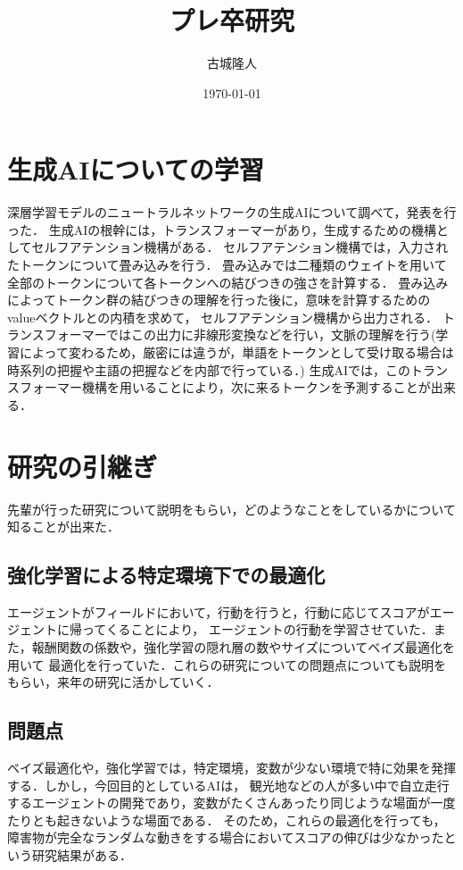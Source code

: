 \documentclass[a4paper,11pt]{ltjsarticle}
\begin{document}
\title{プレ卒研究}
\author{古城隆人}
\date{\today}
\maketitle

\newpage

\section{生成AIについての学習}
深層学習モデルのニュートラルネットワークの生成AIについて調べて，発表を行った．
生成AIの根幹には，トランスフォーマーがあり，生成するための機構としてセルフアテンション機構がある．
セルフアテンション機構では，入力されたトークンについて畳み込みを行う．
畳み込みでは二種類のウェイトを用いて全部のトークンについて各トークンへの結びつきの強さを計算する．
畳み込みによってトークン群の結びつきの理解を行った後に，意味を計算するためのvalueベクトルとの内積を求めて，
セルフアテンション機構から出力される．
トランスフォーマーではこの出力に非線形変換などを行い，文脈の理解を行う(学習によって変わるため，厳密には違うが，単語をトークンとして受け取る場合は時系列の把握や主語の把握などを内部で行っている．)
生成AIでは，このトランスフォーマー機構を用いることにより，次に来るトークンを予測することが出来る．
\section{研究の引継ぎ}
先輩が行った研究について説明をもらい，どのようなことをしているかについて知ることが出来た．
\subsection{強化学習による特定環境下での最適化}
エージェントがフィールドにおいて，行動を行うと，行動に応じてスコアがエージェントに帰ってくることにより，
エージェントの行動を学習させていた．また，報酬関数の係数や，強化学習の隠れ層の数やサイズについてベイズ最適化を用いて
最適化を行っていた．これらの研究についての問題点についても説明をもらい，来年の研究に活かしていく．
\subsection{問題点}
ベイズ最適化や，強化学習では，特定環境，変数が少ない環境で特に効果を発揮する．しかし，今回目的としているAIは，
観光地などの人が多い中で自立走行するエージェントの開発であり，変数がたくさんあったり同じような場面が一度たりとも起きないような場面である．
そのため，これらの最適化を行っても，障害物が完全なランダムな動きをする場合においてスコアの伸びは少なかったという研究結果がある．
\end{document}
